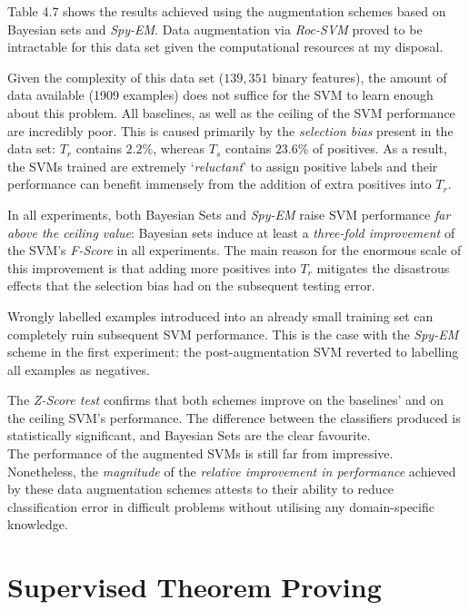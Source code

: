 \documentclass[12pt,twoside,notitlepage,amsart]{report} %
\begin{document}
Table 4.7 shows the results achieved using the augmentation schemes based on Bayesian sets and \emph{Spy-EM}. Data augmentation via \emph{Roc-SVM} proved to be intractable for this data set given the computational resources at my disposal.

Given the complexity of this data set ($139,351$ binary features), the amount of data available (1909 examples) does not suffice for the SVM to learn enough about this problem. All baselines, as well as the ceiling of the SVM performance are {incredibly poor}. This is caused primarily by the \emph{selection bias} present in the data set: $T_r$ contains $2.2\%$, whereas $T_s$ contains $23.6\%$ of positives. As a result, the SVMs trained are extremely `\emph{reluctant}' to assign positive labels and their performance can benefit immensely from the addition of extra positives into $T_r$. 

In all experiments, both Bayesian Sets and \emph{Spy-EM} raise SVM performance \emph{far above the ceiling value}: Bayesian sets induce at least a \emph{three-fold improvement} of the SVM's \emph{F-Score} in all experiments. The main reason for the enormous scale of this improvement is that adding more positives into $T_r$ mitigates the disastrous effects that the {selection bias} had on the subsequent testing error. 

Wrongly labelled examples introduced into an already small training set can completely ruin subsequent SVM performance. This is the case with the \emph{Spy-EM} scheme in the first experiment: the post-augmentation SVM reverted to labelling all examples as negatives.

The \emph{Z-Score test} confirms that both schemes improve on the baselines' and on the ceiling SVM's performance. The difference between the classifiers produced is statistically significant, and Bayesian Sets are the clear favourite. \\

The performance of the augmented SVMs is still far from impressive. Nonetheless, the \emph{magnitude} of the \emph{relative improvement in performance} achieved by these data augmentation schemes attests to their ability to reduce classification error in difficult problems without utilising any domain-specific knowledge.  



	
\section{Supervised Theorem Proving}
	
\end{document}
